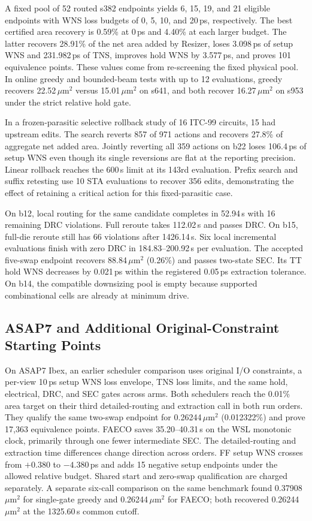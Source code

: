 \documentclass[journal]{IEEEtran}
\newcommand{\um}{\ensuremath{\mu\mathrm{m}^{2}}}
\begin{document}
A fixed pool of 52 routed s382 endpoints yields 6, 15, 19, and 21 eligible endpoints with WNS loss budgets of 0, 5, 10, and 20\,ps, respectively. The best certified area recovery is 0.59\% at 0\,ps and 4.40\% at each larger budget. The latter recovers 28.91\% of the net area added by Resizer, loses 3.098\,ps of setup WNS and 231.982\,ps of TNS, improves hold WNS by 3.577\,ps, and proves 101 equivalence points. These values come from re-screening the fixed physical pool. In online greedy and bounded-beam tests with up to 12 evaluations, greedy recovers 22.52\,\um{} versus 15.01\,\um{} on s641, and both recover 16.27\,\um{} on s953 under the strict relative hold gate.

In a frozen-parasitic selective rollback study of 16 ITC-99 circuits, 15 had upstream edits. The search reverts 857 of 971 actions and recovers 27.8\% of aggregate net added area. Jointly reverting all 359 actions on b22 loses 106.4\,ps of setup WNS even though its single reversions are flat at the reporting precision. Linear rollback reaches the 600\,s limit at its 143rd evaluation. Prefix search and suffix retesting use 10 STA evaluations to recover 356 edits, demonstrating the effect of retaining a critical action for this fixed-parasitic case.

On b12, local routing for the same candidate completes in 52.94\,s with 16 remaining DRC violations. Full reroute takes 112.02\,s and passes DRC. On b15, full-die reroute still has 66 violations after 1426.14\,s. Six local incremental evaluations finish with zero DRC in 184.83--200.92\,s per evaluation. The accepted five-swap endpoint recovers 88.84\,\um{} (0.26\%) and passes two-state SEC. Its TT hold WNS decreases by 0.021\,ps within the registered 0.05\,ps extraction tolerance. On b14, the compatible downsizing pool is empty because supported combinational cells are already at minimum drive.

\subsection{ASAP7 and Additional Original-Constraint Starting Points}

On ASAP7 Ibex, an earlier scheduler comparison uses original I/O constraints, a per-view 10\,ps setup WNS loss envelope, TNS loss limits, and the same hold, electrical, DRC, and SEC gates across arms. Both schedulers reach the 0.01\% area target on their third detailed-routing and extraction call in both run orders. They qualify the same two-swap endpoint for 0.26244\,\um{} (0.012322\%) and prove 17,363 equivalence points. FAECO saves 35.20--40.31\,s on the WSL monotonic clock, primarily through one fewer intermediate SEC. The detailed-routing and extraction time differences change direction across orders. FF setup WNS crosses from \(+0.380\) to \(-4.380\)\,ps and adds 15 negative setup endpoints under the allowed relative budget. Shared start and zero-swap qualification are charged separately. A separate six-call comparison on the same benchmark found 0.37908\,\um{} for single-gate greedy and 0.26244\,\um{} for FAECO; both recovered 0.26244\,\um{} at the 1325.60\,s common cutoff.
\end{document}
